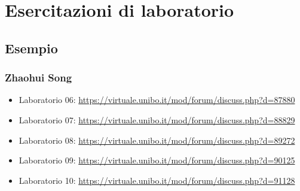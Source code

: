 \documentclass[a4paper,12pt]{report}
\begin{document}
\chapter{Esercitazioni di laboratorio}


\section*{Esempio}

\subsection{Zhaohui Song}

\begin{itemize}
 \item Laboratorio 06: \url{https://virtuale.unibo.it/mod/forum/discuss.php?d=87880}
 \item Laboratorio 07: \url{https://virtuale.unibo.it/mod/forum/discuss.php?d=88829}
 \item Laboratorio 08: \url{https://virtuale.unibo.it/mod/forum/discuss.php?d=89272}
 \item Laboratorio 09: \url{https://virtuale.unibo.it/mod/forum/discuss.php?d=90125}
 \item Laboratorio 10: \url{https://virtuale.unibo.it/mod/forum/discuss.php?d=91128}

\end{itemize}




\end{document}
